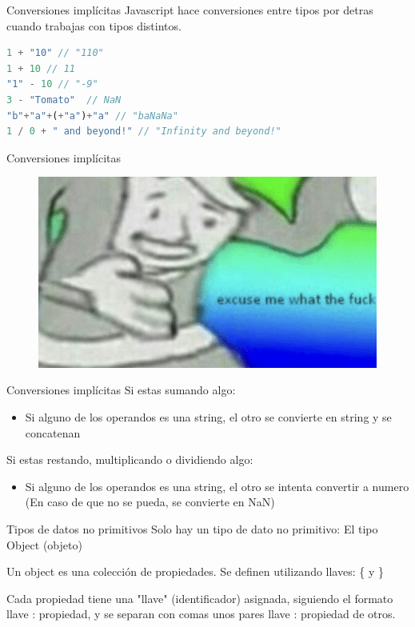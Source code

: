 \documentclass{beamer}
\begin{document}
\begin{frame}[fragile]{Conversiones implícitas}
Javascript hace conversiones entre tipos por detras cuando trabajas con tipos distintos.

\begin{lstlisting}[language=JavaScript]
1 + "10" // "110"
1 + 10 // 11
"1" - 10 // "-9"
3 - "Tomato"  // NaN
"b"+"a"+(+"a")+"a" // "baNaNa"
1 / 0 + " and beyond!" // "Infinity and beyond!"
\end{lstlisting}
\end{frame}

\begin{frame}{Conversiones implícitas}
    \begin{figure}
        \centering
        \includegraphics[width=\textwidth]{images/excuse_me.jpg}
    \end{figure}
\end{frame}

\begin{frame}{Conversiones implícitas}
Si estas sumando algo:
\begin{itemize}
    \item Si alguno de los operandos es una string, el otro se convierte en string y se concatenan
\end{itemize}

Si estas restando, multiplicando o dividiendo algo:
\begin{itemize}
    \item Si alguno de los operandos es una string, el otro se intenta convertir a numero (En caso de que no se pueda, se convierte en NaN)
\end{itemize}
\end{frame}

\begin{frame}{Tipos de datos no primitivos}
Solo hay un tipo de dato no primitivo: El tipo Object (objeto)

Un object es una colección de propiedades. Se definen utilizando llaves: \{ y \}

Cada propiedad tiene una "llave" (identificador) asignada, siguiendo el formato llave : propiedad, y se separan con comas unos pares llave : propiedad de otros.
\end{frame}
\end{document}
